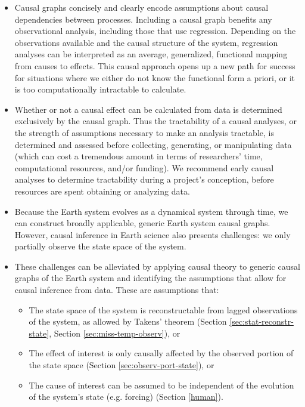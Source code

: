\documentclass[12pt]{article}
\begin{document}
\begin{itemize}
\item Causal graphs concisely and clearly encode assumptions about
  causal dependencies between processes. Including a causal graph
  benefits any observational analysis, including those that use
  regression. Depending on the observations available and the causal
  structure of the system, regression analyses can be interpreted as
  an average, generalized, functional mapping from causes to
  effects. This causal approach opens up a new path for success for
  situations where we either do not know the functional form a priori,
  or it is too computationally intractable to calculate.
\item Whether or not a causal effect can be calculated from data is
  determined exclusively by the causal graph. Thus the tractability of
  a causal analyses, or the strength of assumptions necessary to make
  an analysis tractable, is determined and assessed before collecting,
  generating, or manipulating data (which can cost a tremendous amount
  in terms of researchers' time, computational resources, and/or
  funding). We recommend early causal analyses to determine
  tractability during a project's conception, before resources are
  spent obtaining or analyzing data.
\item Because the Earth system evolves as a dynamical system through
  time, we can construct broadly applicable, generic Earth system
  causal graphs. However, causal inference in Earth science also
  presents challenges: we only partially observe the state space of
  the system.
\item These challenges can be alleviated by applying causal theory to
  generic causal graphs of the Earth system and identifying the
  assumptions that allow for causal inference from data. These are
  assumptions that:
  \begin{itemize}
  \item The state space of the system is reconstructable
    from lagged observations of the system, as allowed by
    Takens' theorem (Section \ref{sec:stat-reconstr-state}, Section \ref{sec:miss-temp-observ}), or
  \item The effect of interest is only causally
    affected by the observed portion of the state space (Section
    \ref{sec:observ-port-state}), or
  \item The cause of interest can be assumed to be independent of the
    evolution of the system's state (e.g. forcing) (Section
    \ref{human}).
  \end{itemize}
\end{itemize}
\end{document}

